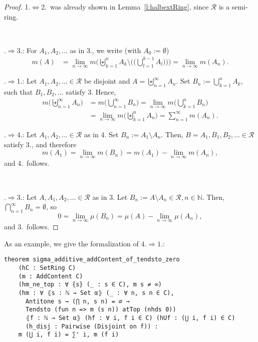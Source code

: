 \documentclass[lean]{DraftAFM}
\begin{document}
\begin{proof}
  1.$\Leftrightarrow$2.\ was already shown in
  Lemma~\ref{l:halbextRing}, since $\mathcal R$ is a semi-ring.

  ~

  .$\Rightarrow$3.: For $A_1, A_2,...$ as in 3., we write
  (with $A_0 := \emptyset$)
  \begin{align*}
     m(A) & %
     = \lim_{n\to\infty}
     m\Big( \biguplus_{k=1}^n A_k \setminus \Big(\Big(\bigcup_{l=1}^{k-1}
     A_l\Big)\Big)\Big) = \lim_{n\to\infty} m(A_n).
  \end{align*}

  .$\Rightarrow$1.: Let $A_1, A_2,... \in \mathcal R$ be
  disjoint and $A = \biguplus_{n=1}^\infty A_n$. Set $B_n :=
  \bigcup_{k=1}^n A_k$, such that $B_1, B_2,...$ satisfy 3. Hence,
  \begin{align*}
    m\Big( \biguplus_{n=1}^\infty A_n\Big) & = m\Big(
    \bigcup_{n=1}^\infty B_n\Big) = \lim_{n\to\infty} m\Big(
    \bigcup_{k=1}^n B_n\Big) \\ & = \lim_{n\to\infty} m\Big(
    \biguplus_{k=1}^n A_n\Big) = \sum_{n=1}^\infty m(A_n).
  \end{align*}

  .$\Rightarrow$4.: Let $A_1, A_2,\dots \in\mathcal R$ as
  in 4. Set $B_n := A_1\setminus A_n$. Then, $B=A_1,B_1,B_2,\dots
  \in\mathcal R$ satisfy 3., and therefore
  $$m(A_1) = \lim_{n\to\infty} m(B_n) = m(A_1) -
  \lim_{n\to\infty}m(A_n),$$ and 4.\ follows.

  ~

  .$\Rightarrow$3.: Let $A,A_1,A_2,\dots \in\mathcal R$ as
  in 3. Let $B_n := A\setminus A_n \in \mathcal R, n\in\mathbb
  N$. Then, $\bigcap_{n=1}^\infty B_n = \emptyset$, so $$0 =
  \lim_{n\to\infty} \mu(B_n) = \mu(A) - \lim_{n\to\infty} \mu(A_n),$$
  and 3.\ follows.
\end{proof}

\noindent
As an example, we give the formalization of $4.\Rightarrow 1.$:

\begin{verbatim}
theorem sigma_additive_addContent_of_tendsto_zero
    (hC : SetRing C)
    (m : AddContent C)
    (hm_ne_top : ∀ {s} (_ : s ∈ C), m s ≠ ∞)
    (hm : ∀ ⦃s : ℕ → Set α⦄ (_ : ∀ n, s n ∈ C),
      Antitone s → (⋂ n, s n) = ∅ →
      Tendsto (fun n => m (s n)) atTop (nhds 0))
      ⦃f : ℕ → Set α⦄ (hf : ∀ i, f i ∈ C) (hUf : (⋃ i, f i) ∈ C)
      (h_disj : Pairwise (Disjoint on f)) :
    m (⋃ i, f i) = ∑' i, m (f i)
\end{verbatim}
\end{document}
